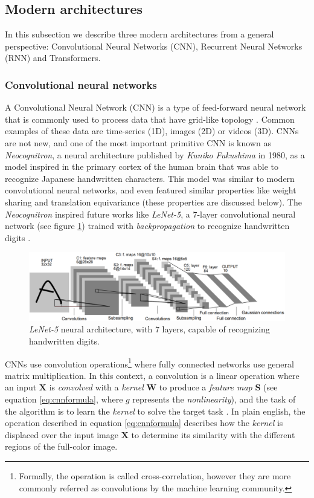 \subsection{Modern architectures}
In this subsection we describe three modern architectures from a general perspective: Convolutional Neural Networks (CNN), Recurrent Neural Networks (RNN) and Transformers.

\subsubsection{Convolutional neural networks}
A Convolutional Neural Network (CNN) is a type of feed-forward neural network that is commonly used to process data that have grid-like topology \autocite{Goodfellow2016}. Common examples of these data are time-series (1D), images (2D) or videos (3D). CNNs are not new, and one of the most important primitive CNN is known as \textit{Neocognitron}, a neural architecture published by \textit{Kuniko Fukushima} \autocite{fukushima1980} in 1980, as a model inspired in the primary cortex of the human brain that was able to recognize Japanese handwritten characters. This model was similar to modern convolutional neural networks, and even featured similar properties like weight sharing and translation equivariance (these properties are discussed below). The \textit{Neocognitron} inspired future works like \textit{LeNet-5}, a 7-layer convolutional neural network (see figure \ref{fig:lenet5}) trained with \textit{backpropagation} to recognize handwritten digits \autocite{lecun1998}.

\begin{figure}
	\centering
	\includegraphics[width=0.7\linewidth]{chapter2/images/lenet5}
	\caption{\textit{LeNet-5} neural architecture, with 7 layers, capable of recognizing handwritten digits.}
	\label{fig:lenet5}
\end{figure}

CNNs use convolution operations\footnote{Formally, the operation is called cross-correlation, however they are more commonly referred as convolutions by the machine learning community.} where fully connected networks use general matrix multiplication. In this context, a convolution is a linear operation where an input $\mathbf{X}$ is \textit{convolved} with a \textit{kernel} $\mathbf{W}$ to produce a \textit{feature map} $\mathbf{S}$ (see equation \ref{eq:cnnformula}, where $g$ represents the \textit{nonlinearity}), and the task of the algorithm is to learn the \textit{kernel} to solve the target task \autocite{haykin1998}. In plain english, the operation described in equation \ref{eq:cnnformula} describes how the \textit{kernel} is displaced over the input image $\mathbf{X}$ to determine its similarity with the different regions of the full-color image.


